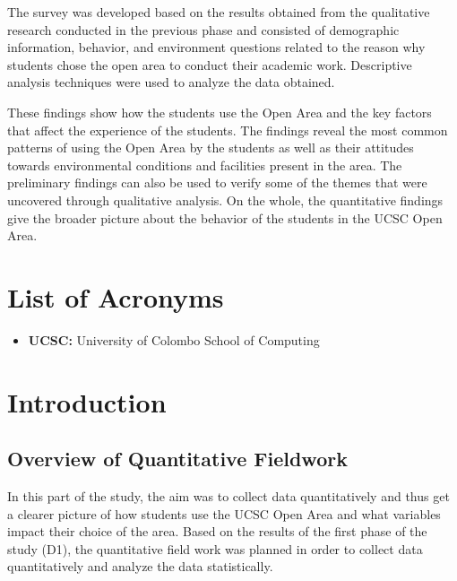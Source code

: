 \documentclass[12pt, a4paper]{report}
\begin{document}
The survey was developed based on the results obtained from the qualitative research conducted in the previous phase and consisted of demographic information, behavior, and environment questions related to the reason why students chose the open area to conduct their academic work. Descriptive analysis techniques were used to analyze the data obtained.

These findings show how the students use the Open Area and the key factors that affect the experience of the students. The findings reveal the most common patterns of using the Open Area by the students as well as their attitudes towards environmental conditions and facilities present in the area. The preliminary findings can also be used to verify some of the themes that were uncovered through qualitative analysis.
On the whole, the quantitative findings give the broader picture about the behavior of the students in the UCSC Open Area.



\tableofcontents
\clearpage


\listoffigures
{}
\clearpage

\chapter*{List of Acronyms}
\begin{itemize}
    \item \textbf{UCSC:} University of Colombo School of Computing
\end{itemize}
\clearpage


\chapter{Introduction}

\section{Overview of Quantitative Fieldwork}

In this part of the study, the aim was to collect data quantitatively and thus get a clearer picture of how students use the UCSC Open Area and what variables impact their choice of the area. Based on the results of the first phase of the study (D1), the quantitative field work was planned in order to collect data quantitatively and analyze the data statistically.
\end{document}
